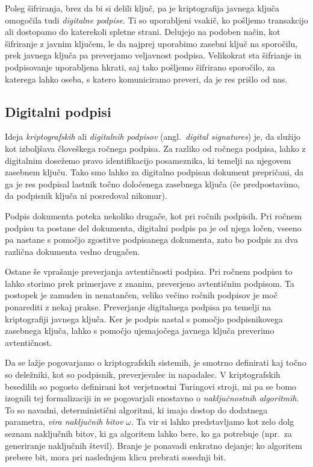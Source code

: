 \documentclass[isrm2, tisk]{fmfdelo}
\begin{document}
Poleg šifriranja, brez da bi si delili ključ, pa je kriptografija javnega ključa omogočila tudi 
\textit{digitalne podpise}. Ti so uporabljeni vsakič, ko pošljemo transakcijo ali dostopamo do katerekoli 
spletne strani. Delujejo na podoben način, kot šifriranje z javnim ključem, le da najprej uporabimo 
zasebni ključ na sporočilu, prek javnega ključa pa preverjamo veljavnost podpisa. Velikokrat sta šifrianje 
in podpisovanje uporabljena hkrati, saj tako pošljemo šifrirano sporočilo, za katerega lahko oseba,
s katero komuniciramo preveri, da je res prišlo od nas.

\subsection{Digitalni podpisi}
Ideja \textit{kriptografskih} ali \textit{digitalnih podpisov} (angl.\ \textit{digital signatures}) je, 
da služijo kot izboljšava človeškega ročnega podpisa. Za razliko od ročnega podpisa, lahko z digitalnim 
dosežemo pravo identifikacijo posameznika, ki temelji na njegovem zasebnem ključu. Tako smo lahko 
za digitalno podpisan dokument prepričani, da ga je res podpisal lastnik točno določenega zasebnega ključa
(če predpostavimo, da podpisnik ključa ni posredoval nikomur). 

Podpis dokumenta poteka nekoliko drugače, kot pri ročnih podpisih. Pri ročnem podpisu ta postane del 
dokumenta, digitalni podpis pa je od njega ločen, vseeno pa nastane s pomočjo zgostitve podpisanega 
dokumenta, zato bo podpis za dva različna dokumenta vedno drugačen.

Ostane še vprašanje preverjanja avtentičnosti podpisa. Pri ročnem podpisu to lahko storimo prek 
primerjave z znanim, preverjeno avtentičnim podpisom. Ta postopek je zamuden in nenatančen, veliko 
večino ročnih podpisov je moč ponarediti z nekaj prakse. Preverjanje digitalnega podpisa pa temelji 
na kriptografiji javnega ključa. Ker je podpis nastal s pomočjo podpisnikovega zasebnega ključa,
lahko s pomočjo ujemajočega javnega ključa preverimo avtentičnost.

Da se lažje pogovarjamo o kriptografskih sistemih, je smotrno definirati kaj točno so deležniki,
kot so podpisnik, preverjevalec in napadalec. V kriptografskih besedilih so pogosto definirani kot
verjetnostni Turingovi stroji, mi pa se bomo izognili tej formalizaciji in se pogovarjali enostavno
o \textit{naključnostnih algoritmih}. To so navadni, deterministični algoritmi, ki imajo dostop do
dodatnega parametra, \textit{vira naključnih bitov} $\omega$. Ta vir si lahko predstavljamo kot zelo
dolg seznam naključnih bitov, ki ga algoritem lahko bere, ko ga potrebuje (npr.\ za generiranje
naključnih števil). Branje je ponavadi enkratno dejanje; ko algoritem prebere bit, mora pri
naslednjem klicu prebrati sosednji bit.
\end{document}
